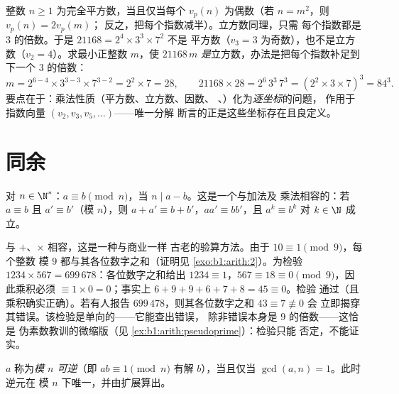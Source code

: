 \begin{example}[用赋值看平方数与立方数]\label{ex:b1:arith:squarecube}
整数 $n \geq 1$ 为完全平方数，当且仅当每个
$v_p(n)$ 为偶数（若 $n = m^2$，则 $v_p(n) = 2v_p(m)$；
反之，把每个指数减半）。立方数同理，只需
每个指数都是 $3$ 的倍数。于是 $21168 = 2^4 \times 3^3 \times 7^2$ 不是
平方数（$v_3 = 3$ 为奇数），也不是立方数（$v_2 = 4$）。求最小正整数 $m$，使
$21168\,m$ \emph{是}立方数，办法是把每个指数补足到
下一个
$3$ 的倍数：
\[
m = 2^{6-4} \times 3^{3-3} \times 7^{3-2} = 2^2 \times 7 = 28,
\qquad
21168 \times 28 = 2^6\,3^3\,7^3 = (2^2 \times 3 \times 7)^3
= 84^3 .
\]
要点在于：乘法性质（平方数、立方数、因数、
、）化为\emph{逐坐标}的问题，
作用于指数向量 $(v_2, v_3, v_5, \dots)$——唯一分解
断言的正是这些坐标存在且良定义。
\end{example}

\section{同余}

\begin{definition}\label{def:b1:arith:congruence}
对 $n \in \N^*$：$a \equiv b \pmod n$，当 $n \mid
a - b$。这是一个与加法及
乘法相容的：若 $a \equiv b$ 且 $a' \equiv b'$（模 $n$），则
$a + a' \equiv b + b'$，$aa' \equiv bb'$，且 $a^k \equiv b^k$
对 $k \in \N$ 成立。
\end{definition}

\begin{example}[弃九法]\label{ex:b1:arith:castingnines}
与 $+$、$\times$ 相容，这是一种与商业一样
古老的验算方法。由于 $10 \equiv 1 \pmod 9$，每个整数
模 $9$ 都与其各位数字之和（证明见
\cref{exo:b1:arith:2}）。为检验 $1234 \times 567 =
699\,678$：各位数字之和给出 $1234 \equiv 1$，$567 \equiv 18
\equiv 0 \pmod 9$，因此乘积必须 $\equiv 1 \times 0 =
0$；事实上 $6 + 9 + 9 + 6 + 7 + 8 = 45 \equiv 0$。检验
通过（且乘积确实正确）。若有人报告
$699\,478$，则其各位数字之和 $43 \equiv 7 \not\equiv 0$ 会
立即揭穿其错误。该检验是单向的——它能查出错误，
除非错误本身是 $9$ 的倍数——这恰是
伪素数教训的微缩版（见
\cref{ex:b1:arith:pseudoprime}）：检验只能
否定，不能证实。
\end{example}

\begin{proposition}[模 $n$ 的可逆性]\label{prop:b1:arith:invmod}
$a$ 称为\emph{模 $n$ 可逆}（即 $ab \equiv 1 \pmod n$
有解 $b$），当且仅当 $\gcd(a, n) = 1$。此时逆元在
模 $n$ 下唯一，并由扩展算出。
\end{proposition}

